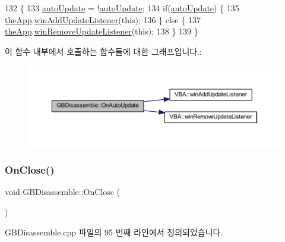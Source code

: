 \begin{DoxyCode}
132 \{
133   \mbox{\hyperlink{class_g_b_disassemble_ac61f998dee99af2b137fe45297a5715a}{autoUpdate}} = !\mbox{\hyperlink{class_g_b_disassemble_ac61f998dee99af2b137fe45297a5715a}{autoUpdate}};
134   \textcolor{keywordflow}{if}(\mbox{\hyperlink{class_g_b_disassemble_ac61f998dee99af2b137fe45297a5715a}{autoUpdate}}) \{
135     \mbox{\hyperlink{_v_b_a_8cpp_a8095a9d06b37a7efe3723f3218ad8fb3}{theApp}}.\mbox{\hyperlink{class_v_b_a_af0712f70a90d023ab8327a366be08174}{winAddUpdateListener}}(\textcolor{keyword}{this});
136   \} \textcolor{keywordflow}{else} \{
137     \mbox{\hyperlink{_v_b_a_8cpp_a8095a9d06b37a7efe3723f3218ad8fb3}{theApp}}.\mbox{\hyperlink{class_v_b_a_a2d31a0656df2230310aa8dc9e3a735d3}{winRemoveUpdateListener}}(\textcolor{keyword}{this});    
138   \}  
139 \}
\end{DoxyCode}
이 함수 내부에서 호출하는 함수들에 대한 그래프입니다.\+:
\nopagebreak
\begin{figure}[H]
\begin{center}
\leavevmode
\includegraphics[width=350pt]{class_g_b_disassemble_a5fad3e2f0c06721bd881fa0dda1001e4_cgraph}
\end{center}
\end{figure}
\mbox{\label{class_g_b_disassemble_a2cbf8f743dec4f14119762d81f77ad60}} 
\subsubsection{\texorpdfstring{On\+Close()}{OnClose()}}
{\footnotesize\ttfamily void G\+B\+Disassemble\+::\+On\+Close (\begin{DoxyParamCaption}{ }\end{DoxyParamCaption})\hspace{0.3cm}{\ttfamily [protected]}}



G\+B\+Disassemble.\+cpp 파일의 95 번째 라인에서 정의되었습니다.


